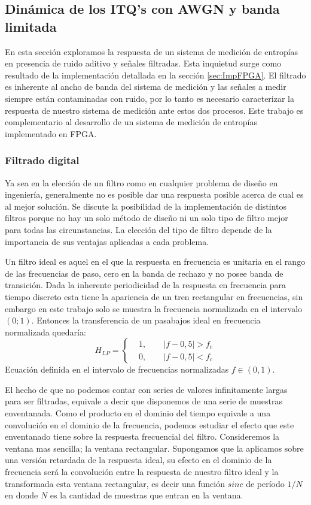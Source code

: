 \subsection{Dinámica de los ITQ's con AWGN y banda limitada}
\label{ssec:TDdS}
	
En esta sección exploramos la respuesta de un sistema de medición de entropías en presencia de ruido aditivo y señales filtradas.
Esta inquietud surge como resultado de la implementación detallada en la sección \ref{sec:ImpFPGA}.
El filtrado es inherente al ancho de banda del sistema de medición y las señales a medir siempre están contaminadas con ruido, por lo tanto es necesario caracterizar la respuesta de nuestro sistema de medición ante estos dos procesos.
Este trabajo es complementario al desarrollo de un sistema de medición de entropías implementado en FPGA.

\subsubsection{Filtrado digital}
\label{sec:filtrado}

Ya sea en la elección de un filtro como en cualquier problema de diseño en ingeniería, generalmente no es posible dar una respuesta posible acerca de cual es al mejor solución. Se discute la posibilidad de la implementación de distintos filtros porque no hay un solo método de diseño ni un solo tipo de filtro mejor para todas las circunstancias. La elección del tipo de filtro depende de la importancia de sus ventajas aplicadas a cada problema.

Un filtro ideal es aquel en el que la respuesta en frecuencia es unitaria en el rango de las frecuencias de paso, cero en la banda de rechazo y no posee banda de transición. Dada la inherente periodicidad de la respuesta en frecuencia para tiempo discreto esta tiene la apariencia de un tren rectangular en frecuencias, sin embargo en este trabajo solo se muestra la frecuencia normalizada en el intervalo $(0;1)$. Entonces la transferencia de un pasabajos ideal en frecuencia normalizada quedaría:
\begin{equation}
H_{LP}=
\left\{ 
\begin{aligned}
&1,\qquad|f-0,5|>f_c\\
&0,\qquad|f-0,5|<f_c
\end{aligned}
\right.
\end{equation}
Ecuación definida en el intervalo de frecuencias normalizadas $f\in\left(0,1\right)$.

El hecho de que no podemos contar con series de valores infinitamente largas para ser filtradas, equivale a decir que disponemos de una serie de muestras enventanada.
Como el producto en el dominio del tiempo equivale a una convolución en el dominio de la frecuencia, podemos estudiar el efecto que este enventanado tiene sobre la respuesta frecuencial del filtro.
Consideremos la ventana mas sencilla; la ventana rectangular. Supongamos que la aplicamos sobre una versión retardada de la respuesta ideal, su efecto en el dominio de la frecuencia será la convolución entre la respuesta de nuestro filtro ideal y la transformada esta ventana rectangular, es decir una función $sinc$ de período $1/N$ en donde $N$ es la cantidad de muestras que entran en la ventana.

